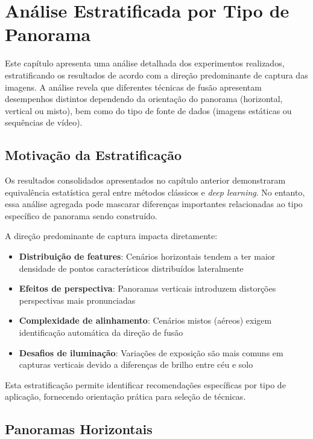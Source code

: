 \chapter{Análise Estratificada por Tipo de Panorama}

Este capítulo apresenta uma análise detalhada dos experimentos realizados, estratificando os resultados de acordo com a direção predominante de captura das imagens. A análise revela que diferentes técnicas de fusão apresentam desempenhos distintos dependendo da orientação do panorama (horizontal, vertical ou misto), bem como do tipo de fonte de dados (imagens estáticas ou sequências de vídeo).

\section{Motivação da Estratificação}

Os resultados consolidados apresentados no capítulo anterior demonstraram equivalência estatística geral entre métodos clássicos e \textit{deep learning}. No entanto, essa análise agregada pode mascarar diferenças importantes relacionadas ao tipo específico de panorama sendo construído.

A direção predominante de captura impacta diretamente:

\begin{itemize}
    \item \textbf{Distribuição de features}: Cenários horizontais tendem a ter maior densidade de pontos característicos distribuídos lateralmente
    \item \textbf{Efeitos de perspectiva}: Panoramas verticais introduzem distorções perspectivas mais pronunciadas
    \item \textbf{Complexidade de alinhamento}: Cenários mistos (aéreos) exigem identificação automática da direção de fusão
    \item \textbf{Desafios de iluminação}: Variações de exposição são mais comuns em capturas verticais devido a diferenças de brilho entre céu e solo
\end{itemize}

Esta estratificação permite identificar recomendações específicas por tipo de aplicação, fornecendo orientação prática para seleção de técnicas.

\section{Panoramas Horizontais}

